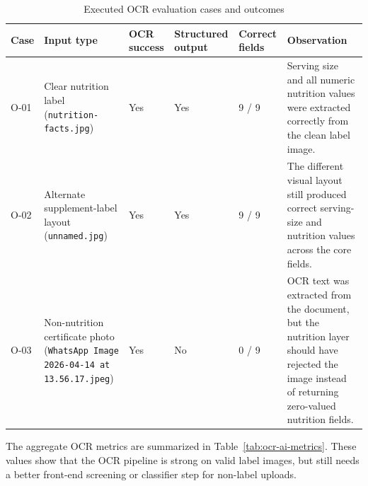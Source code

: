\begin{table}[H]
		\centering
		\scriptsize
		\renewcommand{\arraystretch}{1.2}
		\begin{tabularx}{\textwidth}{|p{1.15cm}|>{\raggedright\arraybackslash}X|p{1.4cm}|p{1.8cm}|p{1.8cm}|>{\raggedright\arraybackslash}X|}
			\hline
			\textbf{Case} & \textbf{Input type} & \textbf{OCR success} & \textbf{Structured output} & \textbf{Correct fields} & \textbf{Observation} \\
			\hline
			O-01 & Clear nutrition label (\texttt{nutrition-facts.jpg}) & Yes & Yes & 9 / 9 & Serving size and all numeric nutrition values were extracted correctly from the clean label image. \\
			\hline
		O-02 & Alternate supplement-label layout (\texttt{unnamed.jpg}) & Yes & Yes & 9 / 9 & The different visual layout still produced correct serving-size and nutrition values across the core fields. \\
		\hline
		O-03 & Non-nutrition certificate photo (\texttt{WhatsApp Image 2026-04-14 at 13.56.17.jpeg}) & Yes & No & 0 / 9 & OCR text was extracted from the document, but the nutrition layer should have rejected the image instead of returning zero-valued nutrition fields. \\
		\hline
	\end{tabularx}
	\caption{Executed OCR evaluation cases and outcomes}
	\label{tab:ocr-case-summary}
\end{table}

The aggregate OCR metrics are summarized in
Table~\ref{tab:ocr-ai-metrics}. These values show that the OCR pipeline
is strong on valid label images, but still needs a better front-end
screening or classifier step for non-label uploads.

